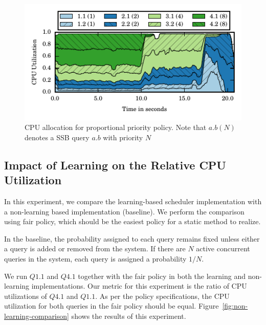\begin{figure}[]
	\centering
	\includegraphics[width=\columnwidth]{figures/ssb-priority-uniform-2queries-perclass-cpu-util.pdf}
	\vspace{-2.5em}
	\caption{CPU allocation for proportional priority policy. Note that $a.b  (N)$ denotes a SSB query $a.b$ with priority $N$}
	\label{fig:pp-cpu-util}
\end{figure}


\subsection{Impact of Learning on the Relative CPU Utilization}\label{ssec:learning-impact-cpu-util}
In this experiment, we compare the learning-based scheduler implementation with a 
non-learning based implementation (baseline).
We perform the comparison using fair policy, which should be the easiest policy for a static method to realize.

In the baseline, the probability assigned to each query remains fixed unless either a query is added or removed from the system.
If there are $N$ active concurrent queries in the system, each query is assigned a probability $1/N$.

We run $Q1.1$ and $Q4.1$ together with the fair policy in both the learning and 
non-learning implementations.
Our metric for this experiment is the ratio of CPU utilizations of $Q4.1$ and $Q1.1$.
As per the policy specifications, the CPU utilization for both queries in the fair policy 
should be equal. %
Figure~\ref{fig:non-learning-comparison} shows the results of this experiment.

